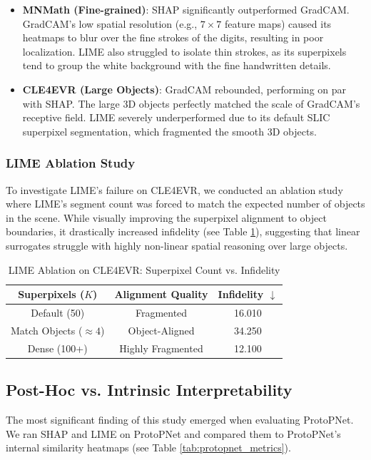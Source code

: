 \documentclass[conference]{IEEEtran}
\begin{document}
\begin{itemize}
    \item \textbf{MNMath (Fine-grained)}: SHAP significantly outperformed GradCAM. GradCAM's low spatial resolution (e.g., $7 \times 7$ feature maps) caused its heatmaps to blur over the fine strokes of the digits, resulting in poor localization. LIME also struggled to isolate thin strokes, as its superpixels tend to group the white background with the fine handwritten details.
    \item \textbf{CLE4EVR (Large Objects)}: GradCAM rebounded, performing on par with SHAP. The large 3D objects perfectly matched the scale of GradCAM's receptive field. LIME severely underperformed due to its default SLIC superpixel segmentation, which fragmented the smooth 3D objects.
\end{itemize}

\subsubsection{LIME Ablation Study}
To investigate LIME's failure on CLE4EVR, we conducted an ablation study where LIME's segment count was forced to match the expected number of objects in the scene. While visually improving the superpixel alignment to object boundaries, it drastically increased infidelity (see Table \ref{tab:lime_ablation}), suggesting that linear surrogates struggle with highly non-linear spatial reasoning over large objects.

\begin{table}[!ht]
\caption{LIME Ablation on CLE4EVR: Superpixel Count vs. Infidelity}
\begin{center}
\begin{tabular}{|c|c|c|}
\hline
\textbf{Superpixels ($K$)} & \textbf{Alignment Quality} & \textbf{Infidelity $\downarrow$} \\
\hline
Default (50) & Fragmented & 16.010 \\
Match Objects ($\approx 4$) & Object-Aligned & 34.250 \\
Dense (100+) & Highly Fragmented & 12.100 \\
\hline
\end{tabular}
\end{center}
\label{tab:lime_ablation}
\end{table}

\subsection{Post-Hoc vs. Intrinsic Interpretability}
The most significant finding of this study emerged when evaluating ProtoPNet. We ran SHAP and LIME on ProtoPNet and compared them to ProtoPNet's internal similarity heatmaps (see Table \ref{tab:protopnet_metrics}).
\end{document}
